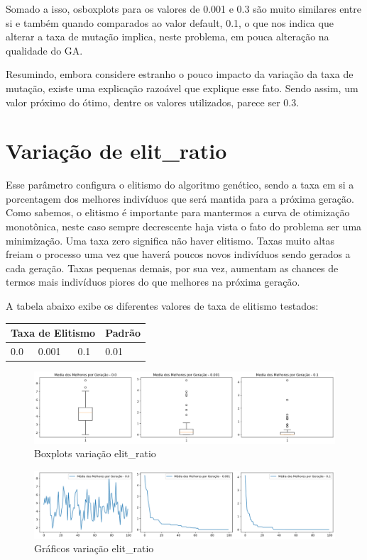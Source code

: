 \documentclass[12pt]{article}
\begin{document}
Somado a isso, osboxplots para os valores de 0.001 e 0.3 são muito similares entre si e também quando comparados ao valor default, 0.1, o que nos indica que alterar a taxa de mutação implica, neste problema, em pouca alteração na qualidade do GA.

Resumindo, embora considere estranho o pouco impacto da variação da taxa de mutação, existe uma explicação razoável que explique esse fato. Sendo assim, um valor próximo do ótimo, dentre os valores utilizados, parece ser 0.3.

\section{Variação de elit\_ratio}

Esse parâmetro configura o elitismo do algoritmo genético, sendo a taxa em si a porcentagem dos melhores indivíduos que será mantida para a próxima geração. Como sabemos, o elitismo é importante para mantermos a curva de otimização monotônica, neste caso sempre decrescente haja vista o fato do problema ser uma minimização. Uma taxa zero significa não haver elitismo. Taxas muito altas freiam o processo uma vez que haverá poucos novos indivíduos sendo gerados a cada geração. Taxas pequenas demais, por sua vez, aumentam as chances de termos mais indivíduos piores do que melhores na próxima geração.

A tabela abaixo exibe os diferentes valores de taxa de elitismo testados:

\begin{table}[H]
	\centering
	\begin{tabular}{|l|l|l|l|}
		\hline
		\multicolumn{3}{|l|}{Taxa de Elitismo} & Padrão \\ \hline
		0.0    & 0.001    & 0.1    & 0.01    \\ \hline
	\end{tabular}
\end{table}

\begin{figure}[H]
	\centering
	\includegraphics[width=0.9\linewidth]{Imagens/elitismo/boxplotElitismo}
	\caption{Boxplots variação elit\_ratio}
	\label{fig:boxplotelitismo}
\end{figure}
\begin{figure}[H]
	\centering
	\includegraphics[width=0.9\linewidth]{Imagens/elitismo/graficoElitismo}
	\caption{Gráficos variação elit\_ratio}
	\label{fig:graficoelitismo}
\end{figure}
\end{document}
